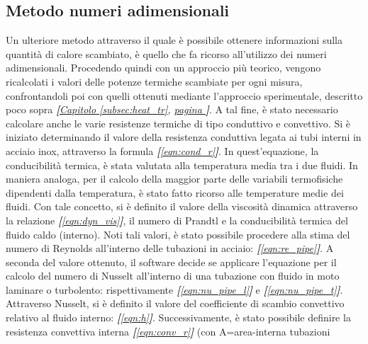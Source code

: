 \documentclass[a4paper,10pt]{article}                                                                                       %
\begin{document}
\subsection{Metodo numeri adimensionali}                                                                                    %
\label{subsec:adimnum_meth}                                                                                                 %
  Un ulteriore metodo attraverso il quale è possibile ottenere informazioni sulla quantità di calore scambiato, è quello
  che fa ricorso all'utilizzo dei numeri adimensionali. Procedendo quindi con un approccio più teorico, vengono
  ricalcolati i valori delle potenze termiche scambiate per ogni misura, confrontandoli poi con quelli ottenuti mediante
  l'approccio sperimentale, descritto poco sopra
  \textit{\textbf{[}\hyperref[subsec:heat_tr]{Capitolo }\ref{subsec:heat_tr},
  \hyperref[subsec:heat_tr]{pagina }\pageref{subsec:heat_tr}\textbf{]}}. A tal fine, è stato necessario calcolare anche le
  varie resistenze termiche di tipo conduttivo e convettivo. Si è iniziato determinando il valore della resistenza
  conduttiva legata ai tubi interni in acciaio inox, attraverso la formula \textit{\textbf{[}\ref{eqn:cond_r}\textbf{]}}.
  In quest'equazione, la conducibilità termica, è stata valutata alla temperatura media tra i due fluidi. In maniera
  analoga, per il calcolo della maggior parte delle variabili termofisiche dipendenti dalla temperatura, è stato fatto
  ricorso alle temperature medie dei fluidi. Con tale concetto, si è definito il valore della viscosità dinamica attraverso
  la relazione \textit{\textbf{[}\ref{eqn:dyn_vis}\textbf{]}}, il numero di Prandtl e la conducibilità termica del fluido
  caldo (interno). Noti tali valori, è stato possibile procedere alla stima del numero di Reynolds all'interno delle
  tubazioni in acciaio: \textit{\textbf{[}\ref{eqn:re_pipe}\textbf{]}}. A seconda del valore ottenuto, il software decide
  se applicare l'equazione per il calcolo del numero di Nusselt all'interno di una tubazione con fluido in moto laminare
  o turbolento: rispettivamente \textit{\textbf{[}\ref{eqn:nu_pipe_l}\textbf{]}} e
  \textit{\textbf{[}\ref{eqn:nu_pipe_t}\textbf{]}}. Attraverso Nusselt, si è definito il valore del coefficiente di scambio
  convettivo relativo al fluido interno: \textit{\textbf{[}\ref{eqn:h}\textbf{]}}. Successivamente, è stato possibile
  definire la resistenza convettiva interna \textit{\textbf{[}\ref{eqn:conv_r}\textbf{]}} (con A=area-interna tubazioni
\end{document}
